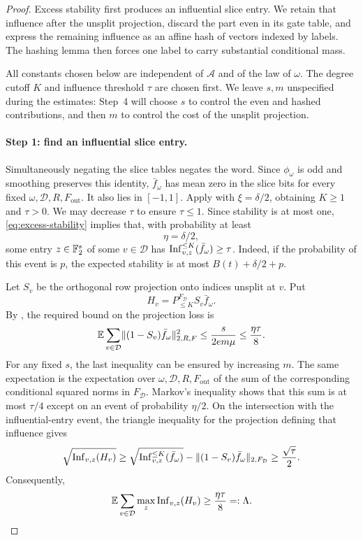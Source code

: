 \begin{proof}
Excess stability first produces an influential slice entry. We retain
that influence after the unsplit projection, discard the part even in
its gate table, and express the remaining influence as an affine hash
of vectors indexed by labels. The hashing lemma then forces one label
to carry substantial conditional mass.

All constants chosen below are independent of $\mathcal A$ and of the
law of $\omega$. The degree cutoff $K$ and influence threshold $\tau$
are chosen first. We leave $s,m$ unspecified during the estimates:
Step~4 will choose $s$ to control the even and hashed contributions, and
then $m$ to control the cost of the unsplit projection.

\paragraph{Step 1: find an influential slice entry.}
Simultaneously negating the slice tables negates the word. Since
$\phi_\omega$ is odd and smoothing preserves this identity,
$\bar f_\omega$ has mean zero in the slice bits for every fixed
$\omega,\mathcal D,R,F_{\mathrm{out}}$. It also lies in $[-1,1]$.
Apply  with $\xi=\delta/2$, obtaining $K\ge1$ and $\tau>0$.
We may decrease $\tau$ to ensure $\tau\le1$.
Since stability is at most one, \eqref{eq:excess-stability} implies that,
with probability at least
\[
 \eta=\delta/2,
\]
some entry $z\in\mathbb F_2^s$ of some $v\in\mathcal D$ has
$\operatorname{Inf}_{v,z}^{\le K}(\bar f_\omega)\ge\tau$.
Indeed, if the probability of this event is $p$, the expected stability is
at most $B(t)+\delta/2+p$.

Let $S_v$ be the orthogonal row projection onto indices unsplit at $v$.
Put
\[
 H_v=P_{\le K}^{F_{\mathcal D}}S_v\bar f_\omega.
\]
By , the required bound on the projection loss is
\begin{equation}\label{eq:choose-m}
 \mathbb E\sum_{v\in\mathcal D}
 \lVert(1-S_v)\bar f_\omega\rVert_{2,R,F}^2
 \le\frac{s}{2em\mu}\le\frac{\eta\tau}{8}.
\end{equation}
For any fixed $s$, the last inequality can be ensured by increasing $m$.
The same expectation is the expectation over
$\omega,\mathcal D,R,F_{\mathrm{out}}$ of the sum of the corresponding
conditional squared norms in $F_{\mathcal D}$. Markov's inequality shows
that this sum is at most $\tau/4$ except on an event of probability
$\eta/2$. On the intersection with the influential-entry event, the
triangle inequality for the projection defining that influence gives
\[
 \sqrt{\operatorname{Inf}_{v,z}(H_v)}
 \ge\sqrt{\operatorname{Inf}_{v,z}^{\le K}(\bar f_\omega)}
      -\lVert(1-S_v)\bar f_\omega\rVert_{2,F_{\mathcal D}}
 \ge\frac{\sqrt\tau}{2}.
\]
Consequently,
\begin{equation}\label{eq:large-max-sum}
 \mathbb E\sum_{v\in\mathcal D}\max_z\operatorname{Inf}_{v,z}(H_v)
 \ge\frac{\eta\tau}{8}=:\Lambda.
\end{equation}


\end{proof}
